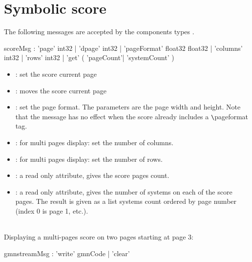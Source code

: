 \documentclass[a4paper,twoside]{report}
\newcommand{\sublevel}[1]	{\section{#1}}
\begin{document}
\sublevel{Symbolic score}
\label{gmnpage}

The following messages are accepted by the components types . 


\begin{rail}
scoreMsg :      'page' int32
			| 'dpage' int32
			| 'pageFormat' float32 float32
			| 'columns' int32
			| 'rows' int32
			| 'get' ( 'pageCount'| 'systemCount' )
\end{rail}

\begin{itemize}
\item {}: set the score current page
\item {}: moves the score current page
\item {}: set the page format. The parameters are the page width and height. Note that the message has no effect when the score already includes a \verb+\+pageformat tag.
\item {}: for multi pages display: set the number of columns.
\item {}: for multi pages display: set the number of rows.
\item {}:  a read only attribute, gives the score pages count.
\item {}:  a read only attribute, gives the number of systems on each of the score pages. The result is given as a list systems count ordered by page number (index 0 is page 1, etc.).
\end{itemize}


\example \\
Displaying a multi-pages score on two pages starting at page 3:


\begin{rail}
gmnstreamMsg :      'write' gmnCode
				| 'clear' 
\end{rail}
\end{document}
